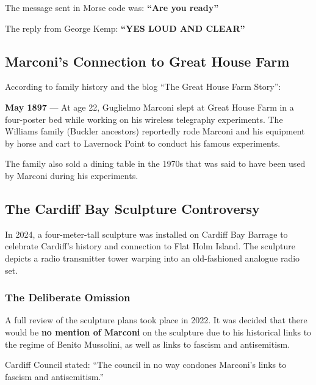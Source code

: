 \documentclass[11pt,a4paper]{article}
\begin{document}
The message sent in Morse code was: \textbf{``Are you ready''}

The reply from George Kemp: \textbf{``YES LOUD AND CLEAR''}

\subsection{Marconi's Connection to Great House Farm}

According to family history and the blog ``The Great House Farm Story'':

\begin{timeline}
\textbf{May 1897} --- At age 22, Guglielmo Marconi slept at Great House Farm in a four-poster bed while working on his wireless telegraphy experiments. The Williams family (Buckler ancestors) reportedly rode Marconi and his equipment by horse and cart to Lavernock Point to conduct his famous experiments.
\end{timeline}

The family also sold a dining table in the 1970s that was said to have been used by Marconi during his experiments.

\subsection{The Cardiff Bay Sculpture Controversy}

\begin{keyfact}
In 2024, a four-meter-tall sculpture was installed on Cardiff Bay Barrage to celebrate Cardiff's history and connection to Flat Holm Island. The sculpture depicts a radio transmitter tower warping into an old-fashioned analogue radio set.
\end{keyfact}

\subsubsection{The Deliberate Omission}

\begin{grievance}
A full review of the sculpture plans took place in 2022. It was decided that there would be \textbf{no mention of Marconi} on the sculpture due to his historical links to the regime of Benito Mussolini, as well as links to fascism and antisemitism.

Cardiff Council stated: ``The council in no way condones Marconi's links to fascism and antisemitism.''
\end{grievance}
\end{document}
